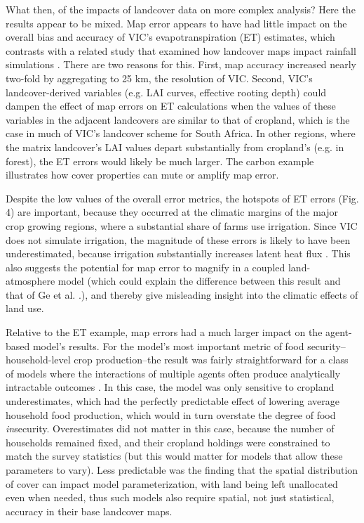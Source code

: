 \documentclass{pnastwo}
\begin{document}
\begin{article}
What then, of the impacts of landcover data on more complex analysis?  Here the results appear to be mixed. Map error appears to have had little impact on the overall bias and accuracy of VIC's evapotranspiration (ET) estimates, which contrasts with a related study that examined how landcover maps impact rainfall simulations \cite{ge_impacts_2007}. There are two reasons for this. First, map accuracy increased nearly two-fold by aggregating to 25 km, the resolution of VIC. Second, VIC's landcover-derived variables (e.g. LAI curves, effective rooting depth) could dampen the effect of map errors on ET calculations when the values of these variables in the adjacent landcovers are similar to that of cropland, which is the case in much of VIC's landcover scheme for South Africa. In other regions, where the matrix landcover's LAI values depart substantially from cropland's (e.g. in forest), the ET errors would likely be much larger. The carbon example illustrates how cover properties can mute or amplify map error.  

Despite the low values of the overall error metrics, the hotspots of ET errors (Fig. 4) are important, because they occurred at the climatic margins of the major crop growing regions, where a substantial share of farms use irrigation. Since VIC does not simulate irrigation, the magnitude of these errors is likely to have been underestimated, because irrigation substantially increases latent heat flux \cite{sacks_effects_2008}. This also suggests the potential for map error to magnify in a coupled land-atmosphere model (which could explain the difference between this result and that of Ge et al. \cite{ge_impacts_2007}.), and thereby give misleading insight into the climatic effects of land use.     

Relative to the ET example, map errors had a much larger impact on the agent-based model's results. For the model's most important metric of food security--household-level crop production--the result was fairly straightforward for a class of models where the interactions of multiple agents often produce analytically intractable outcomes \cite{janssen_empirically_2006}. In this case, the model was only sensitive to cropland underestimates, which had the perfectly predictable effect of lowering average household food production, which would in turn overstate the degree of food \emph{in}security. Overestimates did not matter in this case, because the number of households remained fixed, and their cropland holdings were constrained to match the survey statistics (but this would matter for models that allow these parameters to vary). Less predictable was the finding that the spatial distribution of cover can impact model parameterization, with land being left unallocated even when needed, thus such models also require spatial, not just statistical, accuracy in their base landcover maps.  


\end{article}
\end{document}
